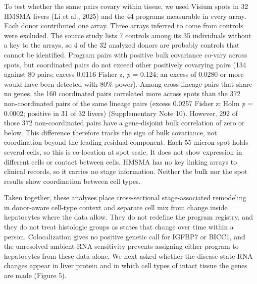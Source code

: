 To test whether the same pairs covary within tissue, we used Visium spots in 32 HMSMA livers (Li et al., 2025) and the 44 programs measurable in every array. Each donor contributed one array. Three arrays inferred to come from controls were excluded. The source study lists 7 controls among its 35 individuals without a key to the arrays, so 4 of the 32 analyzed donors are probably controls that cannot be identified. Program pairs with positive bulk covariance co-vary across spots, but coordinated pairs do not exceed other positively covarying pairs (134 against 80 pairs; excess 0.0116 Fisher z, \emph{p} = 0.124; an excess of 0.0280 or more would have been detected with 80\% power). Among cross-lineage pairs that share no genes, the 160 coordinated pairs correlated more across spots than the 372 non-coordinated pairs of the same lineage pairs (excess 0.0257 Fisher z; Holm \emph{p} = 0.0002; positive in 31 of 32 livers) (Supplementary Note 10). However, 292 of those 372 non-coordinated pairs have a gene-disjoint bulk correlation of zero or below. This difference therefore tracks the sign of bulk covariance, not coordination beyond the leading residual component. Each 55-micron spot holds several cells, so this is co-location at spot scale. It does not show expression in different cells or contact between cells. HMSMA has no key linking arrays to clinical records, so it carries no stage information. Neither the bulk nor the spot results show coordination between cell types.

Taken together, these analyses place cross-sectional stage-associated remodeling in donor-aware cell-type context and separate cell mix from change inside hepatocytes where the data allow. They do not redefine the program registry, and they do not treat histologic groups as states that change over time within a person. Colocalization gives no positive genetic call for IGFBP7 or BICC1, and the unresolved ambient-RNA sensitivity prevents assigning either program to hepatocytes from these data alone. We next asked whether the disease-state RNA changes appear in liver protein and in which cell types of intact tissue the genes are made (Figure 5).
